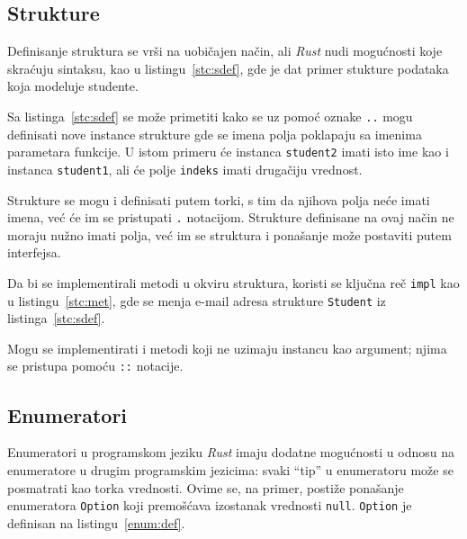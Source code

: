 \documentclass[12pt,oneside]{memoir}
\begin{document}


\subsection{Strukture}
Definisanje struktura se vrši na uobičajen način, ali \emph{Rust} nudi mogućnosti koje skraćuju
sintaksu, kao u listingu~\ref{stc:sdef}, gde je dat primer stukture podataka koja modeluje
studente.



Sa listinga~\ref{stc:sdef} se može primetiti kako se uz pomoć oznake \texttt{..} mogu definisati
nove instance strukture gde se imena
polja poklapaju sa imenima parametara funkcije. U istom primeru će instanca \texttt{student2}
imati isto ime kao i instanca \texttt{student1}, ali će polje \texttt{indeks} imati
drugačiju vrednost.

Strukture se mogu i definisati putem torki, s tim da njihova polja neće imati imena, već će
im se pristupati \texttt{.} notacijom. Strukture definisane na ovaj način ne moraju nužno imati
polja, već im se struktura i ponašanje može postaviti putem interfejsa.

Da bi se implementirali metodi u okviru struktura, koristi se ključna reč \texttt{impl} kao u
listingu~\ref{stc:met}, gde se menja e-mail adresa strukture \texttt{Student} iz
listinga~\ref{stc:sdef}.



\noindent
Mogu se implementirati i metodi koji ne uzimaju instancu kao argument; njima se pristupa pomoću
\texttt{::} notacije.

\subsection{Enumeratori}\label{subsec:enum}
Enumeratori u programskom jeziku \emph{Rust} imaju dodatne mogućnosti u odnosu na enumeratore u
drugim programskim jezicima: svaki ``tip'' u enumeratoru može se posmatrati kao torka vrednosti.
Ovime se, na primer, postiže ponašanje enumeratora \texttt{Option} koji premošćava izostanak vrednosti
\texttt{null}. \texttt{Option} je definisan na listingu~\ref{enum:def}.
\end{document}
